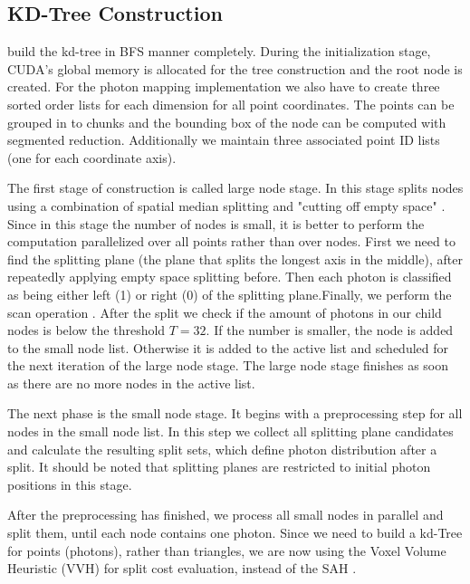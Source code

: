 \subsection{KD-Tree Construction} \label{subsec:kdtree_construction} 

\citeauthor{Zhou2008} build the kd-tree in BFS manner completely. During the initialization stage, CUDA's global memory is allocated for the tree construction and the root node is created. For the photon mapping implementation we also have to create three sorted order lists for each dimension for all point coordinates. The points can be grouped in to chunks and the bounding box of the node can be computed with segmented reduction. Additionally we maintain three associated point ID lists (one for each coordinate axis). 

The first stage of construction is called large node stage. In this stage splits nodes using a combination of spatial median splitting and "cutting off empty space" \cite{Havran2000:PhD}. Since in this stage the number of nodes is small, it is better to perform the computation parallelized over all points rather than over nodes. First we need to find the splitting plane (the plane that splits the longest axis in the middle), after repeatedly applying empty space splitting before. Then each photon is classified as being either left (1) or right (0) of the splitting plane.Finally, we perform the scan operation \cite{Mark2007}. After the split we check if the amount of photons in our child nodes is below the threshold \(T = 32\). If the number is smaller, the node is added to the small node list. Otherwise it is added to the active list and scheduled for the next iteration of the large node stage. The large node stage finishes as soon as there are no more nodes in the active list.

The next phase is the small node stage. It begins with a preprocessing step for all nodes in the small node list. In this step we collect all splitting plane candidates and calculate the resulting split sets, which define photon distribution after a split. It should be noted that splitting planes are restricted to initial photon positions in this stage.

After the preprocessing has finished, we process all small nodes in parallel and split them, until each node contains one photon. Since we need to build a kd-Tree for points (photons), rather than triangles, we are now using the Voxel Volume Heuristic (VVH) \cite{wald:04:VVH} for split cost evaluation, instead of the SAH \cite{Havran2000:PhD}. 

